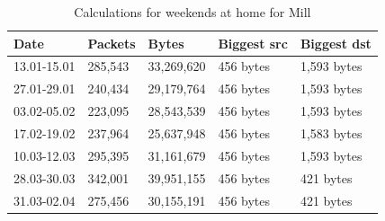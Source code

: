 \begin{table}[H]
    \centering
    \caption{Calculations for weekends at home for Mill}
    \begin{tabular}{|l|l|l|l|l|}
        \hline
        \textbf{Date}    & \textbf{Packets} & \textbf{Bytes} & \textbf{Biggest src} & \textbf{Biggest dst} \\ \hline
        13.01-15.01      & 285,543            & 33,269,620           & 456 bytes            & 1,593 bytes          \\ \hline
        27.01-29.01      & 240,434            & 29,179,764           & 456 bytes            & 1,593 bytes          \\ \hline
        03.02-05.02      & 223,095            & 28,543,539           & 456 bytes            & 1,593 bytes          \\ \hline
        17.02-19.02      & 237,964            & 25,637,948           & 456 bytes            & 1,583 bytes          \\ \hline
        10.03-12.03      & 295,395            & 31,161,679           & 456 bytes            & 1,593 bytes          \\ \hline
        28.03-30.03      & 342,001            & 39,951,155           & 456 bytes            & 421 bytes            \\ \hline
        31.03-02.04      & 275,456            & 30,155,191           & 456 bytes            & 421 bytes            \\ \hline
    \end{tabular}
    \label{tab:MillHomeWeekends}
\end{table}

